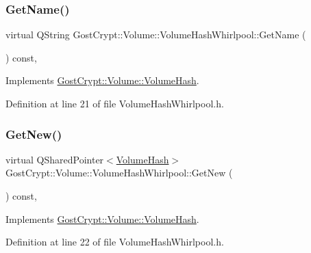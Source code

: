 \subsubsection{\texorpdfstring{Get\+Name()}{GetName()}}
{\footnotesize\ttfamily virtual Q\+String Gost\+Crypt\+::\+Volume\+::\+Volume\+Hash\+Whirlpool\+::\+Get\+Name (\begin{DoxyParamCaption}{ }\end{DoxyParamCaption}) const\hspace{0.3cm}{\ttfamily [inline]}, {\ttfamily [virtual]}}



Implements \hyperlink{class_gost_crypt_1_1_volume_1_1_volume_hash_ac6a1fa9550857b211a304c305a526355}{Gost\+Crypt\+::\+Volume\+::\+Volume\+Hash}.



Definition at line 21 of file Volume\+Hash\+Whirlpool.\+h.

\mbox{\label{class_gost_crypt_1_1_volume_1_1_volume_hash_whirlpool_a5555824b76b08bf911216fbab8d242ef}} 
\subsubsection{\texorpdfstring{Get\+New()}{GetNew()}}
{\footnotesize\ttfamily virtual Q\+Shared\+Pointer$<$\hyperlink{class_gost_crypt_1_1_volume_1_1_volume_hash}{Volume\+Hash}$>$ Gost\+Crypt\+::\+Volume\+::\+Volume\+Hash\+Whirlpool\+::\+Get\+New (\begin{DoxyParamCaption}{ }\end{DoxyParamCaption}) const\hspace{0.3cm}{\ttfamily [inline]}, {\ttfamily [virtual]}}



Implements \hyperlink{class_gost_crypt_1_1_volume_1_1_volume_hash_a4da6870eedb23e17cf26923478478fa6}{Gost\+Crypt\+::\+Volume\+::\+Volume\+Hash}.



Definition at line 22 of file Volume\+Hash\+Whirlpool.\+h.

\mbox{\label{class_gost_crypt_1_1_volume_1_1_volume_hash_whirlpool_a6206f814090643431376953400727853}} 
